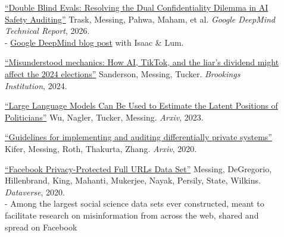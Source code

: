 \documentclass[letterpaper,11pt]{article}
\newcommand{\resheading}[1]{\vspace{4pt}{\large
\colorbox{mygrey}{\begin{minipage}{\textwidth}{\textbf{#1
\vphantom{p\^{E}}}}\end{minipage}}}\vspace{4pt}}
\begin{document}
\resheading{Reports \& Datasets}
\begin{description}

\item[] \href{https://storage.googleapis.com/deepmind-media/DeepMind.com/Blog/piloting-the-worlds-first-double-blind-ai-evaluations/double-blind-evaluations-technical-report.pdf}{``Double Blind Evals: Resolving the Dual Confidentiality Dilemma in AI Safety Auditing''} Trask, Messing, Pahwa, Maham, et al.
\emph{Google DeepMind Technical Report}, 2026. \\
- \href{https://deepmind.google/blog/piloting-the-worlds-first-double-blind-ai-evaluations/}{Google DeepMind blog post} with Isaac \& Lum.

\item[] \href{https://www.brookings.edu/articles/misunderstood-mechanics-how-ai-tiktok-and-the-liars-dividend-might-affect-the-2024-elections/}{``Misunderstood mechanics: How AI, TikTok, and the liar's dividend might affect the 2024 elections''} Sanderson, Messing, Tucker.
\emph{Brookings Institution}, 2024. 

\item[] \href{https://arxiv.org/abs/2303.12057}{``Large Language Models Can Be Used to Estimate the Latent Positions of Politicians''} Wu, Nagler, Tucker, Messing.
\emph{Arxiv}, 2023.

\item[] \href{https://arxiv.org/abs/2002.04049}{``Guidelines for implementing and auditing differentially private systems''} Kifer, Messing, Roth, Thakurta, Zhang.
\emph{Arxiv}, 2020. 

\item[] \href{https://dataverse.harvard.edu/dataset.xhtml?persistentId=doi:10.7910/DVN/TDOAPG}{``Facebook Privacy-Protected Full URLs Data Set''} Messing, DeGregorio, Hillenbrand, King, Mahanti, Mukerjee, Nayak, Persily, State, Wilkins.
\emph{Dataverse}, 2020.  \\
- Among the largest social science data sets ever constructed, meant to facilitate research on misinformation from across the web, shared and spread on Facebook




\end{description}
\end{document}
